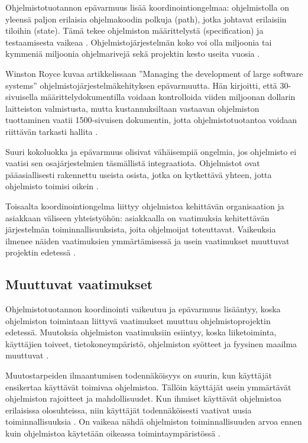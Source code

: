 \documentclass[finnish]{tktltiki2}
\theoremstyle{definition}
\theoremstyle{remark}
\begin{document}
Ohjelmistotuotannon epävarmuus lisää koordinointiongelmaa: ohjelmistolla on yleensä paljon erilaisia ohjelmakoodin polkuja (path), jotka johtavat erilaisiin tiloihin (state). Tämä tekee ohjelmiston määrittelystä (specification) ja testaamisesta vaikeaa \cite{BOE06}. Ohjelmistojärjestelmän koko voi olla miljoonia tai kymmeniä miljoonia ohjelmarivejä sekä projektin kesto useita vuosia \cite{KES95}. 

Winston Royce kuvaa artikkelissaan ''Managing the development of large software systems'' ohjelmistojärjestelmäkehityksen epävarmuutta. Hän kirjoitti, että 30-sivuisella määrittelydokumentilla voidaan kontrolloida viiden miljoonan dollarin laitteiston valmistusta, mutta kustannuksiltaan vastaavan ohjelmiston tuottaminen vaatii 1500-sivuisen dokumentin, jotta ohjelmistotuotantoa voidaan riittävän tarkasti hallita \cite{ROY70}.

Suuri kokoluokka ja epävarmuus olisivat vähäisempiä ongelmia, jos ohjelmisto ei vaatisi sen osajärjestelmien täsmällistä integraatiota. Ohjelmistot ovat pääasiallisesti rakennettu useista osista, jotka on kytkettävä yhteen, jotta ohjelmisto toimisi oikein \cite{KES95}.

Toisaalta koordinointiongelma liittyy ohjelmistoa kehittävän organisaation ja asiakkaan väliseen yhteistyöhön: asiakkaalla on vaatimuksia kehitettävän järjestelmän toiminnallisuuksista, joita ohjelmoijat toteuttavat. Vaikeuksia ilmenee näiden vaatimuksien ymmärtämisessä ja usein vaatimukset muuttuvat projektin edetessä \cite{FOW01a}. 

\subsection{Muuttuvat vaatimukset}

Ohjelmistotuotannon koordinointi vaikeutuu ja epävarmuus lisääntyy, koska ohjelmiston toimintaan liittyvä vaatimukset muuttuu ohjelmistoprojektin edetessä. Muutoksia ohjelmiston vaatimuksiin esiintyy, koska liiketoiminta, käyttäjien toiveet, tietokoneympäristö, ohjelmiston syötteet ja fyysinen maailma muuttuvat \cite{KES95}.

Muutostarpeiden ilmaantumisen todennäköisyys on suurin, kun käyttäjät ensikertaa käyttävät toimivaa ohjelmistoa. Tällöin käyttäjät usein ymmärtävät ohjelmiston rajoitteet ja mahdollisuudet. Kun ihmiset käyttävät ohjelmistoa erilaisissa olosuhteissa, niin käyttäjät todennäköisesti vaativat uusia toiminnallisuuksia \cite{KES95}. On vaikeaa nähdä ohjelmiston toiminnallisuuden arvoa ennen kuin ohjelmistoa käytetään oikeassa toimintaympäristössä \cite{FOW01a}.
\end{document}
